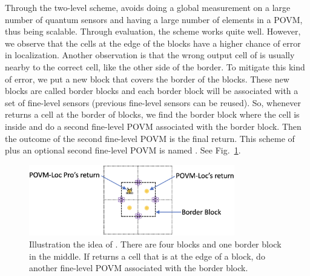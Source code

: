  Through the two-level scheme, \povm avoids doing a global measurement on a large number of quantum sensors and having a large number of elements in a POVM, thus being scalable. 
Through evaluation, the scheme works quite well. However, we observe that the cells at the edge of the blocks have a higher chance of error in localization.
Another observation is that the wrong output cell of \povm is usually nearby to the correct cell, like the other side of the border.
To mitigate this kind of error, we put a new block that covers the border of the blocks.
These new blocks are called border blocks and each border block will be associated with a set of fine-level sensors (previous fine-level sensors can be reused).
So, whenever \povm returns a cell at the border of blocks, we find the border block where the cell is inside and do a second fine-level POVM associated with the border block.
Then the outcome of the second fine-level POVM is the final return.
This scheme of \povm plus an optional second fine-level POVM is named \povmpro.
See Fig.~\ref{fig:povmloc-pro}.


\begin{figure}[t]
    \centering
    \includegraphics[width=0.8\textwidth]{chapters/qce/figures/povm-loc-pro.png}
    \caption{Illustration the idea of \povmpro. There are four blocks and one border block in the middle. 
    If \povm returns a cell that is at the edge of a block, do another fine-level POVM associated with the border block.}
    \label{fig:povmloc-pro}
\end{figure}


